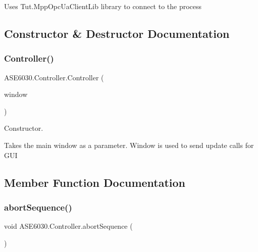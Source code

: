 Uses Tut.\+Mpp\+Opc\+Ua\+Client\+Lib library to connect to the process 

\subsection{Constructor \& Destructor Documentation}
\mbox{\label{class_a_s_e6030_1_1_controller_aa7df468c34d983c6efe88f12abeffb79}} 
\subsubsection{\texorpdfstring{Controller()}{Controller()}}
{\footnotesize\ttfamily A\+S\+E6030.\+Controller.\+Controller (\begin{DoxyParamCaption}\item[{\hyperlink{class_a_s_e6030_1_1_main_window}{Main\+Window}}]{window }\end{DoxyParamCaption})\hspace{0.3cm}{\ttfamily [inline]}}



Constructor. 

Takes the main window as a parameter. Window is used to send update calls for G\+UI 

\subsection{Member Function Documentation}
\mbox{\label{class_a_s_e6030_1_1_controller_a1fa113ab02226c2d8a678365a749e3b0}} 
\subsubsection{\texorpdfstring{abort\+Sequence()}{abortSequence()}}
{\footnotesize\ttfamily void A\+S\+E6030.\+Controller.\+abort\+Sequence (\begin{DoxyParamCaption}{ }\end{DoxyParamCaption})\hspace{0.3cm}{\ttfamily [inline]}}




